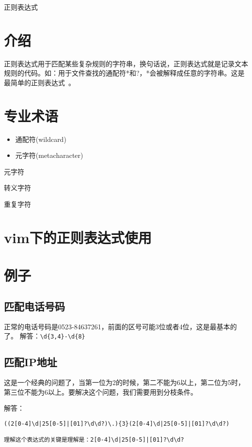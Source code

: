 \documentclass[a4paper,12pt]{ctexart}
\begin{document}
\begin{center}
正则表达式
\end{center}
\normalsize

\section{介绍}
正则表达式用于匹配某些复杂规则的字符串，换句话说，正则表达式就是记录文本规则的代码。如：用于文件查找的通配符*和?，*会被解释成任意的字符串。这是最简单的正则表达式~\cite{regEx入门}。


\section{专业术语}
\begin{itemize}
  \item 通配符(wildcard)
  \item 元字符(metacharacter)
\end{itemize}

元字符

转义字符

重复字符



\section{vim下的正则表达式使用}

\section{例子}
\subsection{匹配电话号码}
正常的电话号码是0523-84637261，前面的区号可能3位或者4位，这是最基本的了。
解答：\verb|\d{3,4}-\d{8}|
\subsection{匹配IP地址}
这是一个经典的问题了，当第一位为2的时候，第二不能为6以上，第二位为5时，第三位不能为6以上。要解决这个问题，我们需要用到分枝条件。

解答：
\begin{verbatim}
((2[0-4]\d|25[0-5]|[01]?\d\d?)\.){3}(2[0-4]\d|25[0-5]|[01]?\d\d?)

理解这个表达式的关键是理解是：2[0-4]\d|25[0-5]|[01]?\d\d?
\end{verbatim}
\end{document}
